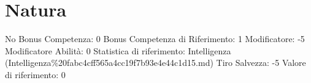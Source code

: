 \section{Natura}\label{natura}

\begin{description}
\tightlist
\item[Tags: ABI]
No Bonus Competenza: 0 Bonus Competenza di Riferimento: 1 Modificatore:
-5 Modificatore Abilità: 0 Statistica di riferimento: Intelligenza
(Intelligenza\%20fabc4cff565a4cc19f7b93e4e44c1d15.md) Tiro Salvezza: -5
Valore di riferimento: 0
\end{description}
